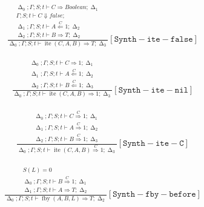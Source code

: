 \documentclass{scrartcl}
\DeclareMathOperator{\fby}{fby}
\DeclareMathOperator{\ite}{ite}
\DeclareMathOperator{\gtypes}{\Delta}
\begin{document}
    \begin{align*}
    \frac{
        \begin{matrix}
        \gtypes_0; \Gamma; S; t \vdash C \Rightarrow Boolean; \gtypes_1 \\
        \Gamma; S; t \vdash C \Downarrow false;  \\
        \gtypes_1; \Gamma; S; t \vdash A \overset{C}{\Leftarrow} 1; \gtypes_2 \\
        \gtypes_2; \Gamma; S; t \vdash B \Rightarrow T; \gtypes_2
        \end{matrix}
    }{
        \gtypes_0; \Gamma; S; t \vdash \ite(C,A,B) \Rightarrow T; \gtypes_3
    }[\mathtt{Synth-ite-false}]
    \end{align*}
    
    \begin{align*}
    \frac{
        \begin{matrix}
        \gtypes_0; \Gamma; S; t \vdash C \Rightarrow 1; \gtypes_1 \\
        \gtypes_1; \Gamma; S; t \vdash A \overset{C}{\Leftarrow} 1; \gtypes_2 \\
        \gtypes_2; \Gamma; S; t \vdash B \overset{C}{\Leftarrow} 1; \gtypes_3
        \end{matrix}
    }{
        \gtypes_0; \Gamma; S; t \vdash \ite(C,A,B) \Rightarrow 1; \gtypes_3
    }[\mathtt{Synth-ite-nil}]
    \end{align*}
    
    \begin{align*}
    \frac{
        \begin{matrix}
        \gtypes_0; \Gamma; S; t \vdash C \overset{C}{\Rightarrow} 1; \gtypes_1 \\
        \gtypes_1; \Gamma; S; t \vdash A \overset{C}{\Rightarrow} 1; \gtypes_2 \\
        \gtypes_2; \Gamma; S; t \vdash B \overset{C}{\Rightarrow} 1; \gtypes_3
        \end{matrix}
    }{
        \gtypes_0; \Gamma; S; t \vdash \ite(C,A,B) \overset{C}{\Rightarrow} 1; \gtypes_3
    }[\mathtt{Synth-ite-C}]
    \end{align*}
    
    \begin{align*}
    \frac{
        \begin{matrix}
        S(L) = 0 \\
        \gtypes_0; \Gamma; S; t \vdash B \overset{C}{\Rightarrow} 1; \gtypes_1 \\
        \gtypes_1; \Gamma; S; t \vdash A \Rightarrow T; \gtypes_2
        \end{matrix}
    }{
        \gtypes_0; \Gamma; S; t \vdash \fby(A, B, L) \Rightarrow T; \gtypes_2
    }[\mathtt{Synth-fby-before}]
    \end{align*}
    
\end{document}
